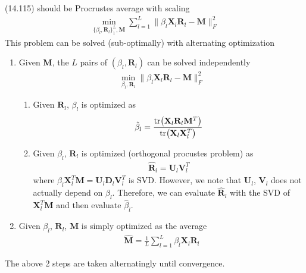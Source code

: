 \begin{exercise}
  (14.115) should be Procrustes average with scaling
  \begin{align}
    \min_{\{\beta_l,\mathbf{R}_l\}_1^L,\mathbf{M}}
    \sum_{l=1}^L\|\beta_l\mathbf{X}_l\mathbf{R}_l - \mathbf{M}\|_F^2
  \end{align}
  This problem can be solved (sub-optimally) with alternating optimization
  \begin{enumerate}
    \item Given $\mathbf{M}$, the $L$ pairs of $(\beta_l,\mathbf{R}_l)$ can be
    solved independently
    \begin{align}
      \min_{\beta_l,\mathbf{R}_l} \|\beta_l\mathbf{X}_l\mathbf{R}_l -
      \mathbf{M}\|_F^2
    \end{align}
    \begin{enumerate}
      \item Given $\mathbf{R}_l$, $\beta_l$ is optimized as
      \begin{align}
        \hat{\beta}_l = \frac{\tr(\mathbf{X}_l\mathbf{R}_l\mathbf{M}^T)}
        {\tr(\mathbf{X}_l\mathbf{X}_l^T)}
      \end{align}
      \item Given $\beta_l$, $\mathbf{R}_l$ is optimized (orthogonal procustes
      problem) as
      \begin{align}
        \hat{\mathbf{R}}_l = \mathbf{U}_l\mathbf{V}_l^T
      \end{align}
      where $\beta_l\mathbf{X}_l^T\mathbf{M} =
      \mathbf{U}_l\mathbf{D}_l\mathbf{V}_l^T$ is SVD. However, we note that
      $\mathbf{U}_l$, $\mathbf{V}_l$ does not actually depend on $\beta_l$.
      Therefore, we can evaluate $\hat{\mathbf{R}}_l$ with the SVD of 
      $\mathbf{X}_l^T\mathbf{M}$ and then evaluate $\hat{\beta}_l$.
    \end{enumerate}
    \item Given $\beta_l$, $\mathbf{R}_l$, $\mathbf{M}$ is simply optimized as
    the average
    \begin{align}
      \hat{\mathbf{M}} = \frac{1}{L}\sum_{l=1}^L \beta_l\mathbf{X}_l\mathbf{R}_l
    \end{align}
  \end{enumerate}
  The above 2 steps are taken alternatingly until convergence.
\end{exercise}

